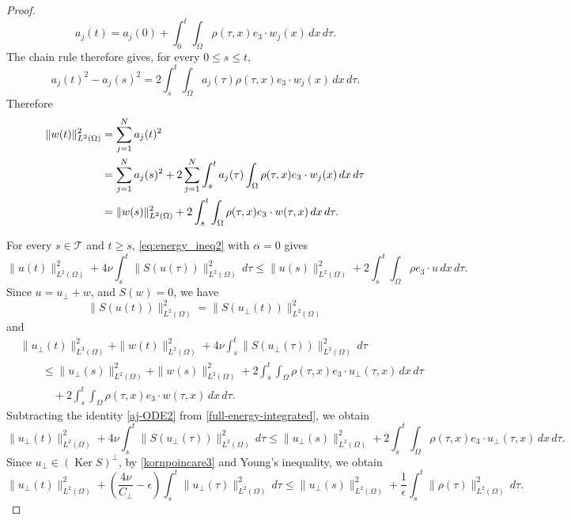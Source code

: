 \documentclass[11pt,reqno]{amsart}
\theoremstyle{plain}
\numberwithin{equation}{section}
\DeclareMathOperator{\kernel}{Ker}
\begin{document}
\begin{proof}
\[
a_j(t)=a_j(0)+\int_0^t\int_\Omega\rho(\tau,x)e_3\cdot w_j(x)\,dx\,d\tau.
\]
The chain rule therefore gives, for every $0\le s\le t$,
\[
a_j(t)^2-a_j(s)^2=2\int_s^t\int_\Omega a_j(\tau)\rho(\tau,x)e_3\cdot w_j(x)\,dx\,d\tau.
\]
Therefore
\begin{align}
\|w(t)\|_{L^2(\Omega)}^2
&=\sum_{j=1}^N a_j(t)^2 \notag\\
&=\sum_{j=1}^N a_j(s)^2
+2\sum_{j=1}^N\int_s^t a_j(\tau)
\int_\Omega \rho(\tau,x)e_3\cdot w_j(x)\,dx\,d\tau \notag\\
&=\|w(s)\|_{L^2(\Omega)}^2
+2\int_s^t\int_\Omega \rho(\tau,x)e_3\cdot w(\tau,x)\,dx\,d\tau.
\label{aj-ODE2}
\end{align}


For every $s\in\mathcal T$ and $t\ge s$, \eqref{eq:energy_ineq2} with $\alpha=0$ gives
\[
\|u(t)\|^2_{L^2(\Omega)}+4\nu\int_s^t\|S(u(\tau))\|^2_{L^2(\Omega)}\,d\tau\le\|u(s)\|^2_{L^2(\Omega)}+2\int_s^t\int_\Omega\rho e_3\cdot u\,dx\,d\tau.
\]
Since $u=u_\perp+w$, and $S(w)=0$, we have
\[
\|S(u(t))\|^2_{L^2(\Omega)}=\|S(u_\perp(t))\|^2_{L^2(\Omega)}
\]
and 
\begin{equation}\label{full-energy-integrated}
\begin{aligned}
&\|u_\perp(t)\|^2_{L^2(\Omega)}
+\|w(t)\|^2_{L^2(\Omega)}
+4\nu\int_s^t \|S(u_\perp(\tau))\|_{L^2(\Omega)}^2\,d\tau  \\
&\qquad\le
\|u_\perp(s)\|^2_{L^2(\Omega)}
+\|w(s)\|^2_{L^2(\Omega)}
+2\int_s^t\int_\Omega \rho(\tau,x)e_3\cdot u_\perp(\tau,x)\,dx\,d\tau \\
&\qquad\quad
+2\int_s^t\int_\Omega \rho(\tau,x)e_3\cdot w(\tau,x)\,dx\,d\tau.
\end{aligned}
\end{equation}
Subtracting the identity \eqref{aj-ODE2} from \eqref{full-energy-integrated}, we obtain 
\begin{equation}\label{uperp-energy-integrated}
\|u_\perp(t)\|^2_{L^2(\Omega)}
+4\nu\int_s^t \|S(u_\perp(\tau))\|^2_{L^2(\Omega)}\,d\tau
\le
\|u_\perp(s)\|^2_{L^2(\Omega)}
+
2\int_s^t\int_\Omega \rho(\tau,x)e_3\cdot u_\perp(\tau,x)\,dx\,d\tau.
\end{equation}
Since $u_\perp\in (\kernel S)^\perp$, by \eqref{kornpoincare3} and Young's inequality, we obtain
\begin{equation}\label{uperp-integrated}
\|u_\perp(t)\|^2_{L^2(\Omega)}
+
\left(\frac{4\nu}{C_\perp}-\epsilon\right)
\int_s^t \|u_\perp(\tau)\|^2_{L^2(\Omega)}\,d\tau
\le
\|u_\perp(s)\|^2_{L^2(\Omega)}
+
\frac{1}{\epsilon}
\int_s^t \|\rho(\tau)\|^2_{L^2(\Omega)}\,d\tau.

\end{equation}
\end{proof}
\end{document}
